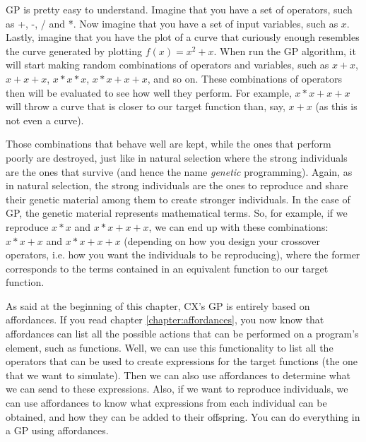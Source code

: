 \documentclass[11pt,fleqn,openany]{book} %
\begin{document}
GP is pretty easy to understand. Imagine that you have a set of operators, such as +, -, / and *. Now imagine that you have a set of input variables, such as $x$. Lastly, imagine that you have the plot of a curve that curiously enough resembles the curve generated by plotting $f(x) = x^2 + x$. When run the GP algorithm, it will start making random combinations of operators and variables, such as $x+x$, $x+x+x$, $x*x*x$, $x*x + x + x$, and so on. These combinations of operators then will be evaluated to see how well they perform. For example, $x * x + x + x$ will throw a curve that is closer to our target function than, say, $x + x$ (as this is not even a curve).

Those combinations that behave well are kept, while the ones that perform poorly are destroyed, just like in natural selection where the strong individuals are the ones that survive (and hence the name \emph{genetic} programming). Again, as in natural selection, the strong individuals are the ones to reproduce and share their genetic material among them to create stronger individuals. In the case of GP, the genetic material represents mathematical terms. So, for example, if we reproduce $x * x$ and $x * x + x + x$, we can end up with these combinations: $x * x + x$ and $x * x + x + x$ (depending on how you design your crossover operators, i.e. how you want the individuals to be reproducing), where the former corresponds to the terms contained in an equivalent function to our target function.

As said at the beginning of this chapter, CX's GP is entirely based on affordances. If you read chapter \ref{chapter:affordances}, you now know that affordances can list all the possible actions that can be performed on a program's element, such as functions. Well, we can use this functionality to list all the operators that can be used to create expressions for the target functions (the one that we want to simulate). Then we can also use affordances to determine what we can send to these expressions. Also, if we want to reproduce individuals, we can use affordances to know what expressions from each individual can be obtained, and how they can be added to their offspring. You can do everything in a GP using affordances.
\end{document}
